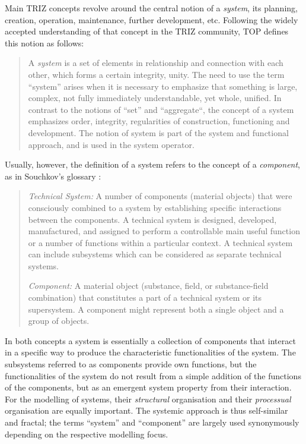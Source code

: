 \documentclass[12pt,a4paper]{article}
\begin{document}
Main TRIZ concepts revolve around the central notion of a \emph{system}, its
planning, creation, operation, maintenance, further development,
etc. Following the widely accepted understanding of that concept in the TRIZ
community, TOP defines this notion as follows:
\begin{quote}
  A \emph{system} is a set of elements in relationship and connection with
  each other, which forms a certain integrity, unity. The need to use the term
  “system” arises when it is necessary to emphasize that something is large,
  complex, not fully immediately understandable, yet whole, unified. In
  contrast to the notions of “set” and “aggregate“, the concept of a system
  emphasizes order, integrity, regularities of construction, functioning and
  development. The notion of system is part of the system and functional
  approach, and is used in the system operator.
\end{quote}
Usually, however, the definition of a system refers to the concept of a
\emph{component}, as in Souchkov’s glossary \cite{21}:
\begin{quote}  
  \emph{Technical System:} A number of components (material objects) that were
  consciously combined to a system by establishing specific interactions
  between the components. A technical system is designed, developed,
  manufactured, and assigned to perform a controllable main useful function or
  a number of functions within a particular context. A technical system can
  include subsystems which can be considered as separate technical systems.

  \emph{Component:} A material object (substance, field, or substance-field
  combination) that constitutes a part of a technical system or its
  supersystem. A component might represent both a single object and a group of
  objects.
\end{quote}
In both concepts a system is essentially a collection of components that
interact in a specific way to produce the characteristic functionalities of
the system. The subsystems referred to as components provide own functions,
but the functionalities of the system do not result from a simple addition of
the functions of the components, but as an emergent system property from their
interaction. For the modelling of systems, their \emph{structural}
organisation and their \emph{processual} organisation are equally important.
The systemic approach is thus self-similar and fractal; the terms “system” and
“component” are largely used synonymously depending on the respective
modelling focus.
\end{document}
